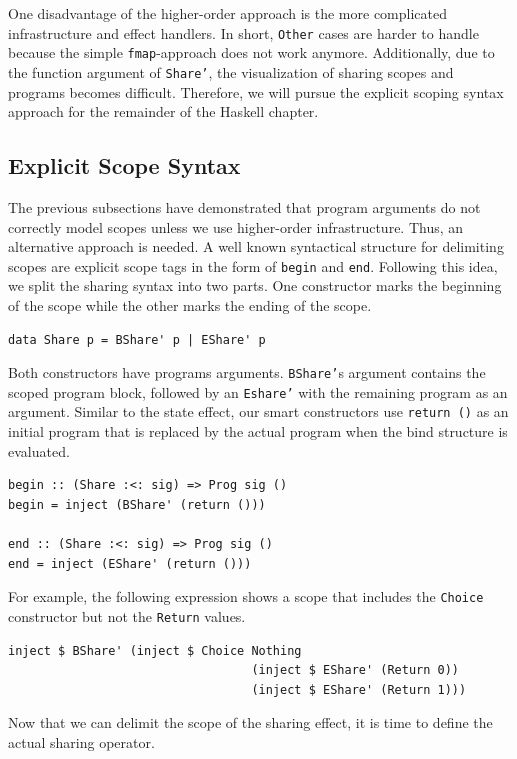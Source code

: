 \documentclass[a4paper, 11pt, fleqn, twoside, abstract=on]{scrreprt}
\newcommand{\hinl}[1]{\texttt{#1}}
\begin{document}
One disadvantage of the higher-order approach is the more complicated infrastructure and effect handlers.
In short, \hinl{Other} cases are harder to handle because the simple \hinl{fmap}-approach does not work anymore.
Additionally, due to the function argument of \hinl{Share'}, the visualization of sharing scopes and programs becomes difficult.
Therefore, we will pursue the explicit scoping syntax approach for the remainder of the Haskell chapter.

\subsection{Explicit Scope Syntax}
\label{subsec:explicit}
The previous subsections have demonstrated that program arguments do not correctly model scopes unless we use higher-order infrastructure.
Thus, an alternative approach is needed.
A well known syntactical structure for delimiting scopes are explicit scope tags in the form of \hinl{begin} and \hinl{end}.
Following this idea, we split the sharing syntax into two parts.
One constructor marks the beginning of the scope while the other marks the ending of the scope.

\begin{verbatim}
data Share p = BShare' p | EShare' p
\end{verbatim}
\noindent
Both constructors have programs arguments.
\hinl{BShare'}s argument contains the scoped program block, followed by an \hinl{Eshare'} with the remaining program as an argument.
Similar to the state effect, our smart constructors use \hinl{return ()} as an initial program that is replaced by the actual program when the bind structure is evaluated.

\begin{verbatim}
begin :: (Share :<: sig) => Prog sig ()
begin = inject (BShare' (return ()))

end :: (Share :<: sig) => Prog sig ()
end = inject (EShare' (return ()))
\end{verbatim}
\noindent
For example, the following expression shows a scope that includes the \hinl{Choice} constructor but not the \hinl{Return} values.

\begin{verbatim}
inject $ BShare' (inject $ Choice Nothing 
                                  (inject $ EShare' (Return 0))
                                  (inject $ EShare' (Return 1)))
\end{verbatim}

Now that we can delimit the scope of the sharing effect, it is time to define the actual sharing operator.
\end{document}

